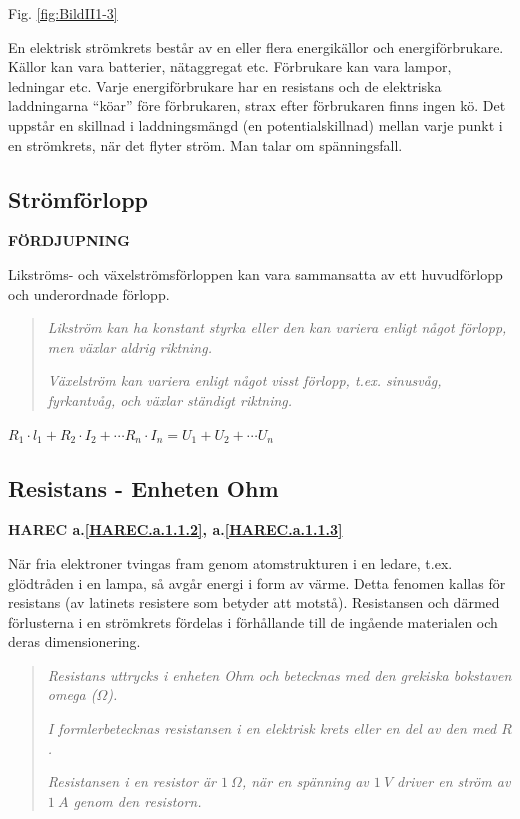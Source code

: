 Fig. \ref{fig:BildII1-3}

En elektrisk strömkrets består av en eller flera energikällor och
energiförbrukare. Källor kan vara batterier, nätaggregat etc. Förbrukare kan
vara lampor, ledningar etc. Varje energiförbrukare har en resistans
och de elektriska laddningarna ``köar'' före förbrukaren, strax efter förbrukaren
finns ingen kö. Det uppstår en skillnad i laddningsmängd (en potentialskillnad)
mellan varje punkt i en strömkrets, när det flyter ström. Man talar om
spänningsfall.

\subsection{Strömförlopp}
\textbf{FÖRDJUPNING}

Likströms- och växelströmsförloppen kan vara sammansatta av ett huvudförlopp och
underordnade förlopp.

\begin{quote}
\emph{Likström kan ha konstant styrka eller den kan variera enligt något
förlopp, men växlar aldrig riktning.}

\emph{Växelström kan variera enligt något visst förlopp, t.ex. sinusvåg,
fyrkantvåg, och växlar ständigt riktning.}
\end{quote}

\(R_1 \cdot l_1 + R_2 \cdot I_2 + \cdots R_n \cdot I_n = U_1 + U_2 + \cdots U_n\)

\subsection{Resistans - Enheten Ohm}
\textbf{HAREC a.\ref{HAREC.a.1.1.2}\label{myHAREC.a.1.1.2c}, a.\ref{HAREC.a.1.1.3}\label{myHAREC.a.1.1.3c}}

När fria elektroner tvingas fram genom atomstrukturen i en ledare, t.ex.
glödtråden i en lampa, så avgår energi i form av värme.
Detta fenomen kallas för resistans (av latinets resistere som betyder att
motstå). Resistansen och därmed förlusterna i en strömkrets fördelas i
förhållande till de ingående materialen och deras dimensionering.

\begin{quote}
\emph{Resistans uttrycks i enheten Ohm och betecknas med den grekiska bokstaven
omega (\(\Omega\)).}

\emph{I formlerbetecknas resistansen i en elektrisk krets eller en del av den med \(R\).}

\emph{Resistansen i en resistor är \(1\ \Omega\), när en spänning av \(1\ V\)
driver en ström av \(1\ A\) genom den resistorn.}
\end{quote}


